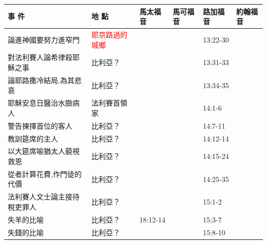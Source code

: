 \begin{table}[H]
  \centering
    \begin{tabular}{p{14em}|p{7.93em}|l|l|l|p{4.855em}}
    \toprule
    \textbf{事 件} & \textbf{地 點} & \multicolumn{1}{p{5.285em}|}{\textbf{馬太福音}} & \multicolumn{1}{p{5.57em}|}{\textbf{馬可福音}} & \multicolumn{1}{p{5.285em}|}{\textbf{路加福音}} & \textbf{約翰福音} \\  \midrule


論進神國要努力進窄門&\textcolor{red}{耶京路過的城鄉}&       &       & \multicolumn{1}{p{5.285em}|}{13:22-30} & \multicolumn{1}{l}{} \\\midrule
對法利賽人論希律殺耶穌之事& 比利亞？   &       &       & \multicolumn{1}{p{5.285em}|}{13:31-33} & \multicolumn{1}{l}{} \\\midrule

論耶路撒冷結局,為其悲哀 & 比利亞？   &       &       & \multicolumn{1}{p{5.285em}|}{13:34-35} & \multicolumn{1}{l}{} \\\midrule


 
耶穌安息日醫治水臌病人 &法利賽首領家&       &       & \multicolumn{1}{p{5.285em}|}{14:1-6} & \multicolumn{1}{l}{} \\ \midrule

警告揀擇首位的客人& 比利亞？   & & & \multicolumn{1}{p{5.285em}|}{14:7-11}& \multicolumn{1}{l}{} \\ \midrule
教訓筵席的主人& 比利亞？   & & & \multicolumn{1}{p{5.285em}|}{14:12-14}& \multicolumn{1}{l}{} \\ \midrule

以大筵席喻猶太人藐視救恩& 比利亞？&&& \multicolumn{1}{p{5.285em}|}{14:15-24} & \multicolumn{1}{l}{} \\ \midrule

從者計算花費,作門徒的代價& 比利亞？   &       &       & \multicolumn{1}{p{5.285em}|}{14:25-35} & \multicolumn{1}{l}{} \\ \midrule


法利賽人文士論主接待稅吏罪人& 比利亞？   & &       & \multicolumn{1}{p{5.285em}|}{15:1-2} & \multicolumn{1}{l}{} \\ \midrule

失羊的比喻 & 比利亞？   &18:12-14       &       & \multicolumn{1}{p{5.285em}|}{15:3-7} & \multicolumn{1}{l}{} \\ \midrule
失錢的比喻 & 比利亞？   & &       & \multicolumn{1}{p{5.285em}|}{15:8-10} & \multicolumn{1}{l}{} \\ \midrule


\end{tabular}
\end{table}
